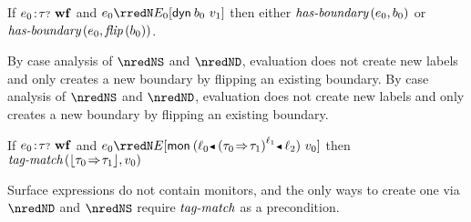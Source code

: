\begin{lemma}\label{H-source-boundary}\leavevmode
  If\/ $e_0\!:\!{\tau{\scriptstyle ?}}~\mathbf{wf}$
  and\/ $\sexpr_0 \rredN \ctx_0[{\edynb{\sbnd_0}{\svalue_1}}]$
  then either\/ $\textit{has-boundary}\,(e_0, b_0)$
  or\/ $\textit{has-boundary}\,(e_0, \textit{flip}\,(b_0))$.
\end{lemma}{
  \newcommand{\shortpf}{By case analysis of\/ $\nredNS$ and\/ $\nredND$, evaluation does not create new labels and only creates a new boundary by flipping an existing boundary.}
\begin{lamportproof*}
  \shortpf
\mainproof
  \shortpf

\end{lamportproof*}}

\begin{lemma}\label{H-mon-type}
  If\/ $e_0\!:\!{\tau{\scriptstyle ?}}~\mathbf{wf}$
  and\/ $\sexpr_0 \rredN \ctx[\emon{\obnd{\sowner_0}{\obars{\tfun{\stype_0}{\stype_1}}{\sowner_1}}{\sowner_2}}{\svalue_0}]$
  then $\textit{tag-match}\,(\lfloor \tau_0\!\Rightarrow\!\tau_1 \rfloor,v_0)$
\end{lemma}{
\begin{lamportproof}
  Surface expressions do not contain monitors, and the only ways to create one
  via\/ $\nredND$ and\/ $\nredNS$ require\/ $\textit{tag-match}$ as a precondition.
\end{lamportproof}}
